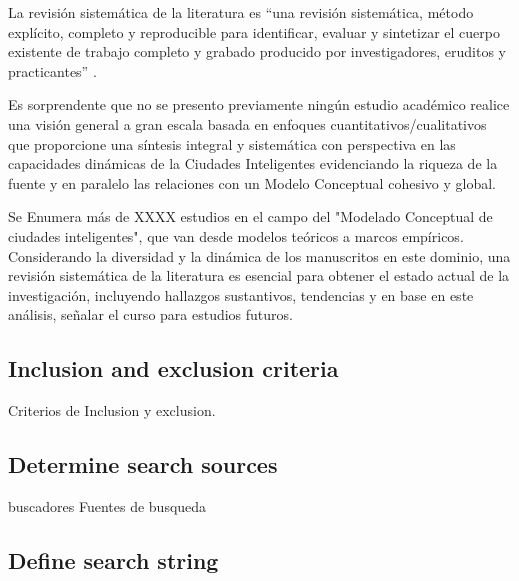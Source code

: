\documentclass[a4paper,fleqn,spanish]{cas-dc}
\begin{document}
La revisión sistemática de la literatura es “una revisión sistemática, método
explícito, completo y reproducible para identificar, evaluar y sintetizar el
cuerpo existente de trabajo completo y grabado producido por investigadores,
eruditos y practicantes” \cite{Okoli2015}.

Es sorprendente que no se presento previamente ningún estudio académico
realice una visión general a gran escala basada en enfoques
cuantitativos/cualitativos que proporcione una síntesis integral y sistemática
con perspectiva en las capacidades dinámicas de la Ciudades Inteligentes
evidenciando la riqueza de la fuente y en paralelo las relaciones con un
Modelo Conceptual cohesivo y global.

Se Enumera más de XXXX estudios en el campo del "Modelado Conceptual de ciudades
inteligentes", que van desde modelos teóricos a marcos empíricos.
Considerando la diversidad y la dinámica de los manuscritos en este dominio,
una revisión sistemática de la literatura es esencial para obtener el estado
actual de la investigación, incluyendo hallazgos sustantivos, tendencias y en
base en este análisis,
señalar el curso para estudios futuros.

% 

\subsection{Inclusion and exclusion criteria}\label{criterio}

Criterios de Inclusion y exclusion.

\subsection{Determine search sources}\label{fuentes}

buscadores
Fuentes de busqueda


\subsection{Define search string}\label{cadena}
\end{document}
